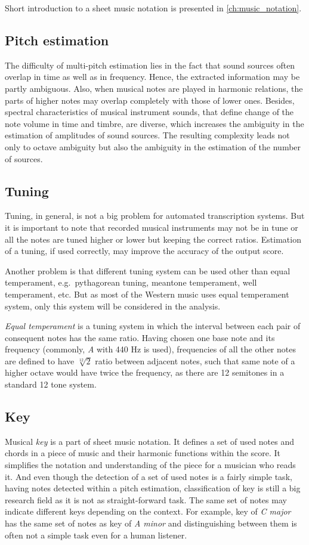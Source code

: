Short introduction to a sheet music notation is presented in \cref{ch:music_notation}.

\subsection{Pitch estimation}\label{subsec:pitch-estimation}
The difficulty of multi-pitch estimation lies in the fact that sound sources often overlap in time as well as in
frequency. Hence, the extracted information may be partly ambiguous. Also, when musical notes are played in harmonic
relations, the parts of higher notes may overlap completely with those of lower ones. Besides, spectral characteristics
of musical instrument sounds, that define change of the note volume in time and timbre, are diverse, which increases
the ambiguity in the estimation of amplitudes of sound sources. The resulting complexity leads not only to octave
ambiguity but also the ambiguity in the estimation of the number of sources.

\subsection{Tuning}\label{subsec:tuning}
Tuning, in general, is not a big problem for automated transcription systems. But it is important to note that recorded
musical instruments may not be in tune or all the notes are tuned higher or lower but keeping the correct ratios.
Estimation of a tuning, if used correctly, may improve the accuracy of the output score.

Another problem is that different tuning system can be used other than equal temperament, e.g.\ pythagorean tuning,
meantone temperament, well temperament, etc. But as most of the Western music uses equal temperament system, only this
system will be considered in the analysis.

\textit{Equal temperament} is a tuning system in which the interval between each pair of consequent notes has the same
ratio. Having chosen one base note and its frequency (commonly, \textit{A} with 440 Hz is used), frequencies of all
the other notes are defined to have $\sqrt[12]{2}$ ratio between adjacent notes, such that same note of a higher octave
would have twice the frequency, as there are 12 semitones in a standard 12 tone system.


\subsection{Key}\label{subsec:key}
Musical \textit{key} is a part of sheet music notation. It defines a set of used notes and chords in a piece of music
and their harmonic functions within the score. It simplifies the notation and understanding of the piece for a musician
who reads it. And even though the detection of a set of used notes is a fairly simple task, having notes detected within
a pitch estimation, classification of key is still a big research field as it is not as straight-forward task. The same
set of notes may indicate different keys depending on the context. For example, key of \textit{C major} has the same
set of notes as key of \textit{A minor} and distinguishing between them is often not a simple task even for a human
listener.

